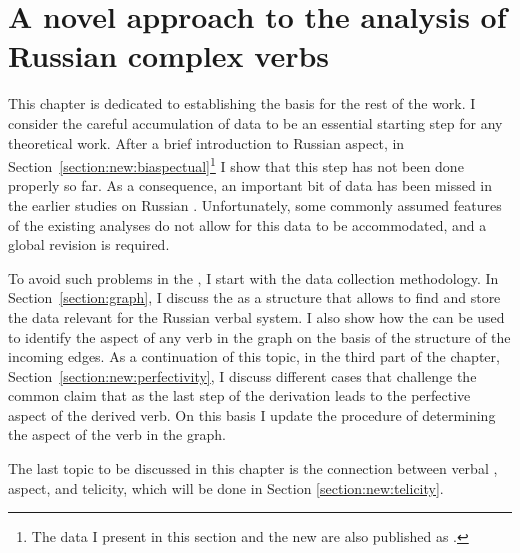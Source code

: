 
\chapter{A novel approach to the analysis of Russian complex verbs} %
\label{Chapter2}
This chapter is dedicated to establishing the basis for the rest of the work. I consider the careful accumulation of data to be an essential starting step for any theoretical work. After a brief introduction to Russian aspect, in Section~\ref{section:new:biaspectual}\footnote{The data I present in this section and the new  are also published as \citealt{ZinovaFilip:13, ZinovaFilip:14b}.} I show that this step has not been done properly so far. As a consequence, an important bit of data has been missed in the earlier studies on Russian . Unfortunately, some commonly assumed features of the existing analyses do not allow for this data to be accommodated, and a global revision is required.
 

To avoid such problems in the , I start with the data collection methodology.
In Section~\ref{section:graph}, I discuss the  as a structure that allows to find and store the data relevant for the Russian verbal  system. I also show how the  can be used to identify the aspect of any verb in the graph on the basis of the structure of the incoming edges. As a continuation of this topic, in the third part of the chapter, Section~\ref{section:new:perfectivity}, I discuss different cases that challenge the common claim that  as the last step of the derivation leads to the perfective aspect of the derived verb. On this basis I update the procedure of determining the aspect of the verb in the graph.  

The last topic to be discussed in this chapter is the connection between verbal , aspect, and telicity, which will be done in Section \ref{section:new:telicity}. 


